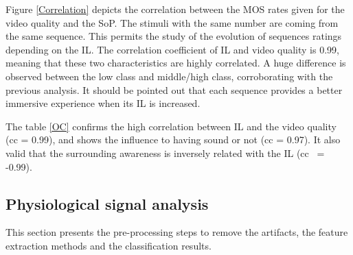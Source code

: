 Figure \ref{Correlation} depicts the correlation between the \ac{MOS} rates given for the video quality and the \ac{SoP}. The stimuli with the same number are coming from the same sequence. This permits the study of the evolution of sequences ratings depending on the \ac{IL}.
The correlation coefficient of \ac{IL} and video quality is 0.99, meaning that these two characteristics are highly correlated. A huge difference is observed between the low class and middle/high class, corroborating with the previous analysis. It should be pointed out that each sequence provides a better immersive experience when its \ac{IL} is increased.


\begin{table}[h]
\end{table}

The table \ref{OC} confirms the high correlation between \ac{IL} and the video quality (cc = 0.99), and shows the influence to having sound or not (cc = 0.97). It also valid that the surrounding awareness is inversely related with the \ac{IL} (cc ~= -0.99).


\subsection{Physiological signal analysis}
This section presents the pre-processing steps to remove the artifacts, the feature extraction methods and the classification results.

